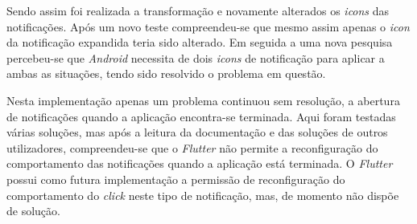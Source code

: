 Sendo assim foi realizada a transformação e novamente alterados os \textit{icons} das notificações. Após um novo teste compreendeu-se que mesmo assim apenas o \textit{icon} da notificação expandida teria sido alterado. Em seguida a uma nova pesquisa percebeu-se que \textit{Android} necessita de dois \textit{icons} de notificação para aplicar a ambas as situações, tendo sido resolvido o problema em questão.

Nesta implementação apenas um problema continuou sem resolução, a abertura de notificações quando a aplicação encontra-se terminada. Aqui foram testadas várias soluções, mas após a leitura da documentação e das soluções de outros utilizadores, compreendeu-se que o \textit{Flutter} não permite a reconfiguração do comportamento das notificações quando a aplicação está terminada. O \textit{Flutter} possui como futura implementação a permissão de reconfiguração do comportamento do \textit{click} neste tipo de notificação, mas, de momento não dispõe de solução.